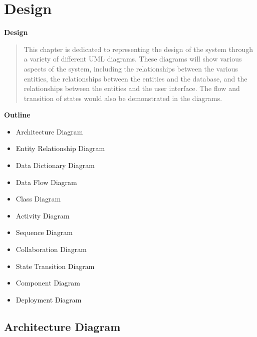 
\section{Design}

\vspace{20mm}


\Huge{\textbf{Design}}

\vspace{20mm}


\begin{abstract}

    This chapter is dedicated to representing the design of the system through a variety of different UML diagrams. These diagrams will show various aspects of the system, including the relationships between the various entities, the relationships between the entities and the database, and the relationships between the entities and the user interface. The flow and transition of states would also be demonstrated in the diagrams.


\end{abstract}

\vspace{20mm}

\large{\textbf{Outline}}

\begin{center}
    \begin{itemize}
        \item Architecture Diagram
        \item Entity Relationship Diagram
        \item Data Dictionary Diagram
        \item Data Flow Diagram
        \item Class Diagram
        \item Activity Diagram
        \item Sequence Diagram
        \item Collaboration Diagram
        \item State Transition Diagram
        \item Component Diagram
        \item Deployment Diagram
    \end{itemize}
\end{center}
\pagebreak


\subsection{Architecture Diagram}
